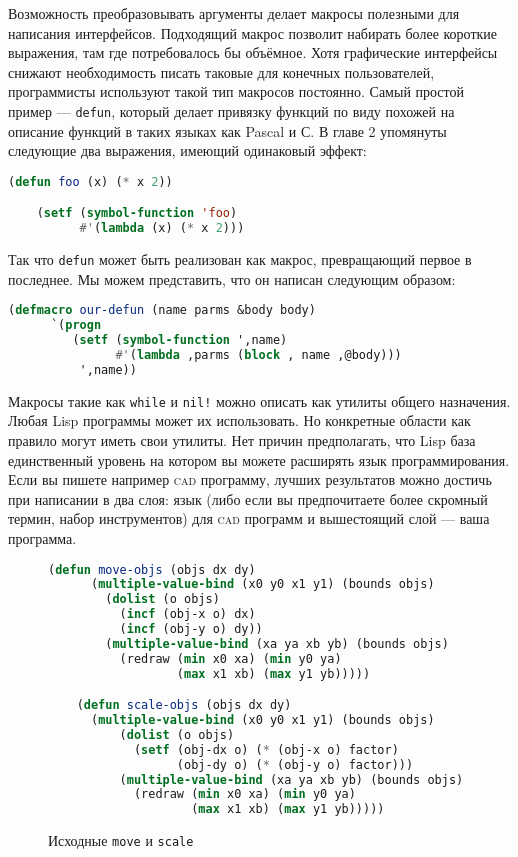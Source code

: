 \documentclass[12pt, a4paper]{article} %
\begin{document}
Возможность преобразовывать аргументы делает макросы полезными для написания интерфейсов. Подходящий макрос позволит набирать более короткие выражения, там где потребовалось бы объёмное. Хотя графические интерфейсы снижают необходимость писать таковые для конечных пользователей, программисты используют такой тип макросов постоянно. Самый простой пример --- \texttt{defun}, который делает привязку функций по виду похожей на описание функций в таких языках как Pascal и С. В главе 2 упомянуты следующие два выражения, имеющий одинаковый эффект:
\begin{lstlisting}[language=Lisp]
    (defun foo (x) (* x 2))

    (setf (symbol-function 'foo)
          #'(lambda (x) (* x 2)))
\end{lstlisting}
Так что \texttt{defun} может быть реализован как макрос, превращающий первое в последнее. Мы можем представить, что он написан следующим образом:
\begin{lstlisting}[language=Lisp]
    (defmacro our-defun (name parms &body body)
      `(progn 
         (setf (symbol-function ',name)
               #'(lambda ,parms (block , name ,@body)))
          ',name))
\end{lstlisting}
Макросы такие как \texttt{while} и \texttt{nil!} можно описать как утилиты общего назначения. Любая Lisp программы может их использовать. Но конкретные области как правило могут иметь свои утилиты. Нет причин предполагать, что Lisp база единственный уровень на котором вы можете расширять язык программирования. Если вы пишете например \textsc{cad} программу, лучших результатов можно достичь при написании в два слоя: язык (либо если вы предпочитаете более скромный термин, набор инструментов) для \textsc{cad} программ и вышестоящий слой --- ваша программа. 
\begin{figure}[h]
\begin{lstlisting}[language=Lisp]
    (defun move-objs (objs dx dy)
      (multiple-value-bind (x0 y0 x1 y1) (bounds objs)
        (dolist (o objs)
          (incf (obj-x o) dx)
          (incf (obj-y o) dy))
        (multiple-value-bind (xa ya xb yb) (bounds objs)
          (redraw (min x0 xa) (min y0 ya)
                  (max x1 xb) (max y1 yb)))))

    (defun scale-objs (objs dx dy)
      (multiple-value-bind (x0 y0 x1 y1) (bounds objs)
          (dolist (o objs)
            (setf (obj-dx o) (* (obj-x o) factor)
                  (obj-dy o) (* (obj-y o) factor)))
          (multiple-value-bind (xa ya xb yb) (bounds objs)
            (redraw (min x0 xa) (min y0 ya)
                    (max x1 xb) (max y1 yb)))))
\end{lstlisting}
\caption{Исходные \texttt{move} и \texttt{scale}}
\label{fig:8-orig-move-scale}
\end{figure}
\end{document}
